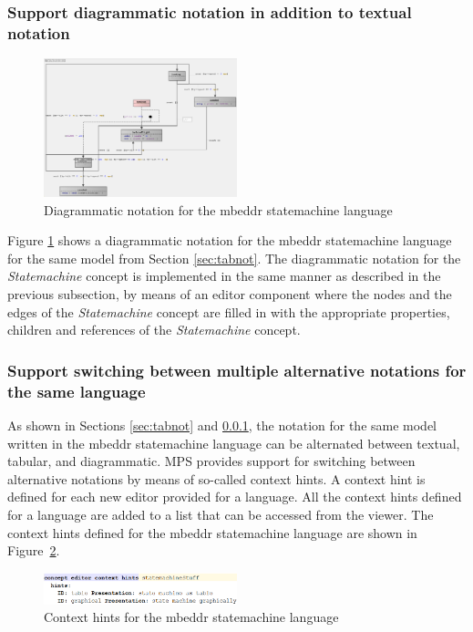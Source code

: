 \documentclass[preprint,numbers,10pt]{sigplanconf}
\begin{document}
\subsubsection{Support diagrammatic notation in addition to textual notation}\label{sec:dianot}
\begin{figure}[H]
	\centering
	\includegraphics[width=0.50\textwidth]{screens/DiagrammaticNotationStatemachines.png}
	\caption{Diagrammatic notation for the mbeddr statemachine
	language}
	\label{fig:dianotationsm}
\end{figure}

Figure \ref{fig:dianotationsm} shows a diagrammatic notation for the mbeddr statemachine language for the same model from Section \ref{sec:tabnot}.
The diagrammatic notation for the \emph{Statemachine} concept is implemented in the same manner as described in the previous subsection,
by means of an editor component where the nodes and the edges of the \emph{Statemachine} concept
are filled in with the appropriate properties, children and references of the \emph{Statemachine} concept.

\subsubsection{Support switching between multiple alternative notations for the same language}
As shown in Sections \ref{sec:tabnot} and \ref{sec:dianot}, the notation for the same model written
in the mbeddr statemachine language can be alternated between textual, tabular, and diagrammatic.
MPS provides support for switching between alternative notations by means of so-called context hints.
A context hint is defined for each new editor provided for a language.
All the context hints defined for a language are added to a list that can be accessed from the viewer.
The context hints defined for the mbeddr statemachine language are shown in Figure~\ref{fig:contextHints}.

\begin{figure}[H]
	\centering
	\includegraphics[width=0.50\textwidth]{screens/ContextHints.png}
	\caption{Context hints for the mbeddr statemachine language}
	\label{fig:contextHints}
\end{figure}
\end{document}
